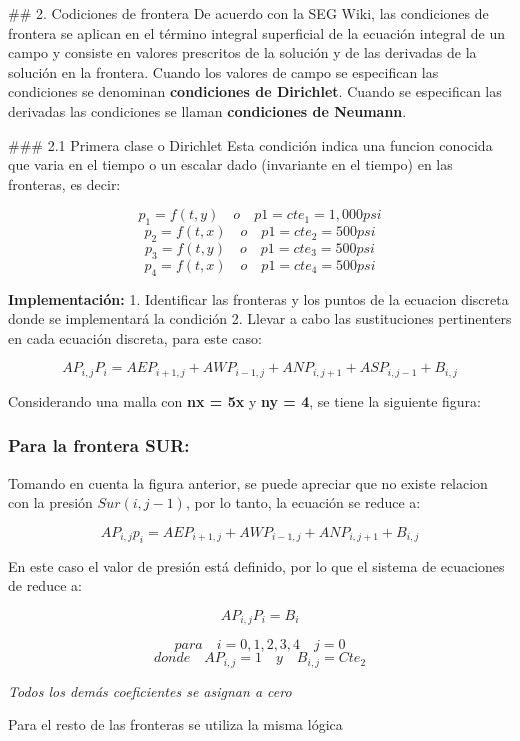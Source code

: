 \documentclass[
  letterpaper,
  DIV=11,
  numbers=noendperiod]{scrreprt}
\begin{document}
\#\# 2. Codiciones de frontera De acuerdo con la SEG Wiki, las
condiciones de frontera se aplican en el término integral superficial de
la ecuación integral de un campo y consiste en valores prescritos de la
solución y de las derivadas de la solución en la frontera. Cuando los
valores de campo se especifican las condiciones se denominan
\textbf{condiciones de Dirichlet}. Cuando se especifican las derivadas
las condiciones se llaman \textbf{condiciones de Neumann}.

\#\#\# 2.1 Primera clase o Dirichlet Esta condición indica una funcion
conocida que varia en el tiempo o un escalar dado (invariante en el
tiempo) en las fronteras, es decir:

\[p_1=f(t,y) \quad o \quad p1=cte_1 = 1,000 psi\]
\[p_2=f(t,x) \quad o \quad p1=cte_2 = 500 psi\]
\[p_3=f(t,y) \quad o \quad p1=cte_3 = 500 psi\]
\[p_4=f(t,x) \quad o \quad p1=cte_4 = 500 psi\]

\textbf{Implementación:} 1. Identificar las fronteras y los puntos de la
ecuacion discreta donde se implementará la condición 2. Llevar a cabo
las sustituciones pertinenters en cada ecuación discreta, para este
caso:

\[AP_{i,j}P_i = AE P_{i+1,j} + AW P_{i-1,j} + AN P_{i,j+1}
+ AS P_{i,j-1} + B_{i,j}\]

Considerando una malla con \textbf{nx = 5x} y \textbf{ny = 4}, se tiene
la siguiente figura:

\subsubsection{Para la frontera SUR:}\label{para-la-frontera-sur}

Tomando en cuenta la figura anterior, se puede apreciar que no existe
relacion con la presión \(Sur (i,j-1)\), por lo tanto, la ecuación se
reduce a:

\[AP_{i,j}p_{i} = AE P_{i+1,j} + AW P_{i-1,j} + AN P_{i,j+1}
+ B_{i,j}\]

En este caso el valor de presión está definido, por lo que el sistema de
ecuaciones de reduce a:

\[AP_{i,j}P_i = B_i\]

\[para \quad i=0,1,2,3,4 \quad j=0\]
\[donde \quad AP_{i,j}=1 \quad y \quad B_{i,j}=Cte_2\]

\emph{Todos los demás coeficientes se asignan a cero}

Para el resto de las fronteras se utiliza la misma lógica
\end{document}
